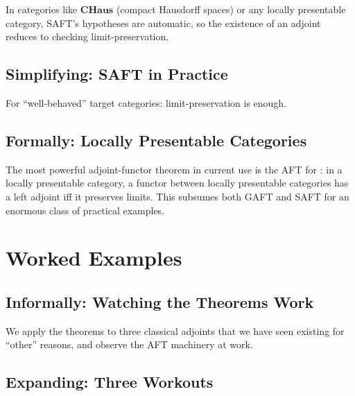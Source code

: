 In categories like $\mathbf{CHaus}$ (compact Hausdorff spaces) or any
locally presentable category, SAFT's hypotheses are automatic, so the
existence of an adjoint reduces to checking limit-preservation.

\subsection{Simplifying: SAFT in Practice}

For ``well-behaved'' target categories: limit-preservation is enough.

\subsection{Formally: Locally Presentable Categories}

The most powerful adjoint-functor theorem in current use is the AFT for
: in a locally presentable category,
a functor between locally presentable categories has a left adjoint iff
it preserves limits. This subsumes both GAFT and SAFT for an enormous
class of practical examples.


\section{Worked Examples}
\label{sec:aft-examples}

\subsection{Informally: Watching the Theorems Work}

We apply the theorems to three classical adjoints that we have seen
existing for ``other'' reasons, and observe the AFT machinery at work.

\subsection{Expanding: Three Workouts}

